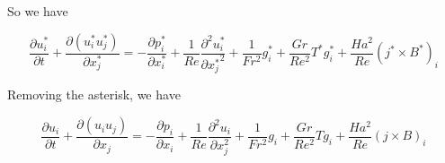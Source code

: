 \documentclass[11pt]{article}
\newcommand{\PD}{\partial}
\begin{document}
So we have

\begin{equation}
	\frac{\PD u_i^*}{\PD t} +
	\frac{\PD (u_i^* u_j^*)}{\PD x_j^*}
	=
	- \frac{\PD p_i^*}{\PD x_i^*}
	+ \frac{1}{Re}
	\frac{\PD^2 u_i^*}{\PD {x_j^*}^2}
	+ \frac{1}{Fr^2}
	g_i^*
	+ \frac{Gr}{Re^2}
	T^*g_i^*
	+ \frac{Ha^2}{Re}
	(j^* \times B^*)_i
\end{equation}

Removing the asterisk, we have

\begin{equation}
	\boxed{
	\frac{\PD u_i}{\PD t} +
	\frac{\PD (u_i u_j)}{\PD x_j}
	=
	- \frac{\PD p_i}{\PD x_i}
	+ \frac{1}{Re}
	\frac{\PD^2 u_i}{\PD x_j^2}
	+ \frac{1}{Fr^2}
	g_i
	+ \frac{Gr}{Re^2}
	T g_i
	+ \frac{Ha^2}{Re}
	(j \times B)_i
	}
\end{equation}



\end{document}
